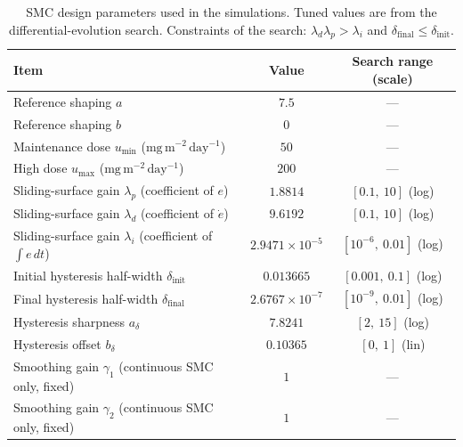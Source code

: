 \begin{table}[htbp]
\centering
\caption{SMC design parameters used in the simulations. Tuned values are from the differential-evolution search. Constraints of the search: $\lambda_d\lambda_p>\lambda_i$ and $\delta_{\mathrm{final}}\le\delta_{\mathrm{init}}$.}
\label{tab:smc-params}
\small
\begin{tabular}{lcc}
\toprule
Item & Value & Search range (scale) \\
\midrule
Reference shaping $a$ & $7.5$ & --- \\
Reference shaping $b$ & $0$ & --- \\
Maintenance dose $u_{\min}$ ($\mathrm{mg\,m^{-2}\,day^{-1}}$) & $50$ & --- \\
High dose $u_{\max}$ ($\mathrm{mg\,m^{-2}\,day^{-1}}$) & $200$ & --- \\
Sliding-surface gain $\lambda_p$ (coefficient of $e$) & $1.8814$ & $[0.1,\ 10]$ (log) \\
Sliding-surface gain $\lambda_d$ (coefficient of $\dot e$) & $9.6192$ & $[0.1,\ 10]$ (log) \\
Sliding-surface gain $\lambda_i$ (coefficient of $\int e\,dt$) & $2.9471{\times}10^{-5}$ & $[10^{-6},\ 0.01]$ (log) \\
Initial hysteresis half-width $\delta_{\mathrm{init}}$ & $0.013665$ & $[0.001,\ 0.1]$ (log) \\
Final hysteresis half-width $\delta_{\mathrm{final}}$ & $2.6767{\times}10^{-7}$ & $[10^{-9},\ 0.01]$ (log) \\
Hysteresis sharpness $a_\delta$ & $7.8241$ & $[2,\ 15]$ (log) \\
Hysteresis offset $b_\delta$ & $0.10365$ & $[0,\ 1]$ (lin) \\
Smoothing gain $\gamma_1$ (continuous SMC only, fixed) & $1$ & --- \\
Smoothing gain $\gamma_2$ (continuous SMC only, fixed) & $1$ & --- \\
\bottomrule
\end{tabular}
\end{table}

